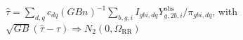 \(\widehat\tau=\sum_{d,q}c_{dq}(GBn)^{-1}\sum_{b,g,i}I_{gbi,dq}Y^{\mathrm{obs}}_{g,2b,i}/\pi_{gbi,dq}\), with \(\sqrt{GB}(\widehat\tau-\tau)\Rightarrow N_2(0,\Omega_{\mathrm{RR}})\)